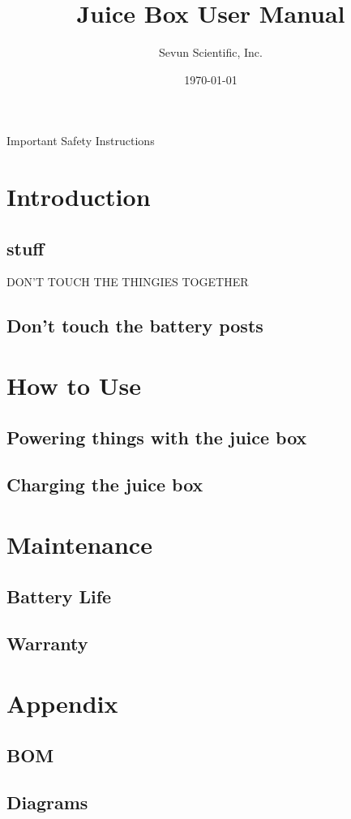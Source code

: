 \documentclass[12pt]{article}
\begin{document}
\title{Juice Box User Manual}
\author{Sevun Scientific, Inc.}
\date{\today}
\maketitle


\newpage
{\Large Important Safety Instructions \par}
\newpage
\tableofcontents

\newpage
\section{Introduction}
	\subsection{stuff}
DON'T TOUCH THE THINGIES TOGETHER
	\subsection{Don’t touch the battery posts}
\section{How to Use}
	\subsection{Powering things with the juice box}
	\subsection{Charging the juice box}
\section{Maintenance}
	\subsection{Battery Life}
	\subsection{Warranty}
\section{Appendix}
	\subsection{BOM}
	\subsection{Diagrams}
\end{document}
